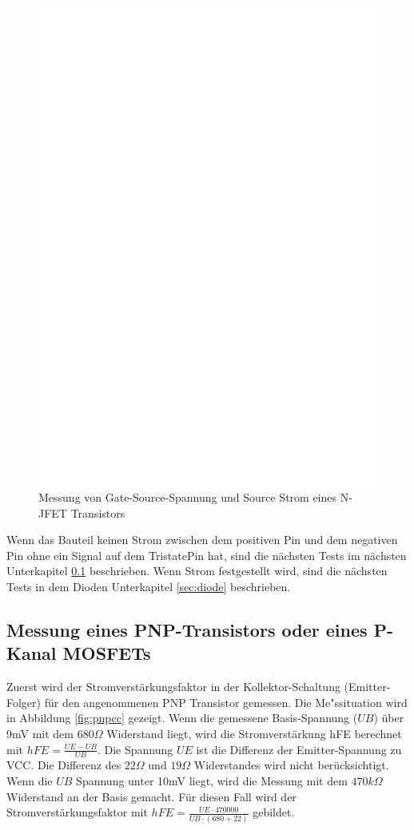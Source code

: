\begin{figure}[H]
\centering
\includegraphics[]{../FIG/JFETcd.eps}
\caption{Messung von Gate-Source-Spannung und Source Strom eines N-JFET Transistors}
\label{fig:JFETcd}
\end{figure}

Wenn das Bauteil keinen Strom zwischen dem positiven Pin und dem negativen Pin ohne ein Signal
auf dem TristatePin hat, sind die n\"achsten Tests im n\"achsten Unterkapitel \ref{sec:pnp} beschrieben.
Wenn Strom festgestellt wird, sind die n\"achsten Tests in dem Dioden Unterkapitel \ref{sec:diode} beschrieben.

\subsection{Messung eines PNP-Transistors oder eines P-Kanal MOSFETs}
\label{sec:pnp}
Zuerst wird der Stromverst\"arkungsfaktor in der Kollektor-Schaltung (Emitter-Folger) f\"ur den angenommenen
PNP Transistor gemessen.
Die Me"ssituation wird in Abbildung \ref{fig:pnpcc} gezeigt.
Wenn die gemessene Basis-Spannung (\(UB\)) \"uber 9mV mit dem \(680\Omega\) Widerstand liegt,
wird die Stromverst\"arkung hFE berechnet mit \(hFE = \frac{UE-UB}{UB}\). 
Die Spannung \(UE\) ist die Differenz der Emitter-Spannung zu VCC.
Die Differenz des \(22\Omega\) und \(19\Omega\) Widerstandes wird nicht ber\"ucksichtigt.
Wenn die \(UB\) Spannung unter 10mV liegt, wird die Messung mit dem \(470k\Omega\) Widerstand an der Basis gemacht.
F\"ur diesen Fall wird der Stromverst\"arkungsfaktor mit \(hFE = \frac{UE \cdot 470000}{UB \cdot (680+22)}\) gebildet.

